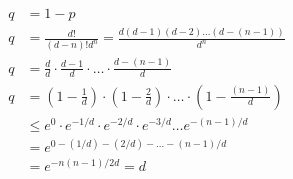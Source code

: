 \documentclass[a4paper,12pt]{article}
\begin{document}
\begin{align*}
  q &= 1 - p\\
  q &= \frac{d!}{(d-n)!d^{n}} = \frac{d(d-1)(d-2)\ldots (d-(n-1))}{d^n}\\
  q &= \frac{d}{d} \cdot \frac{d-1}{d} \cdot \ldots \cdot \frac{d-(n-1)}{d}\\
  q &= (1- \frac{1}{d}) \cdot (1 - \frac{2}{d})\cdot \ldots \cdot (1 -\frac{(n-1)}{d})\\
    &\leq e^{0} \cdot e^{-1/d} \cdot e^{-2/d} \cdot e^{-3/d} \ldots e^{-(n-1)/d}\\
    &= e^{0-(1/d)-(2/d)-\ldots - (n-1)/d} \\ 
    &= e^{-n(n-1)/2d} = d
\end{align*}
\end{document}

